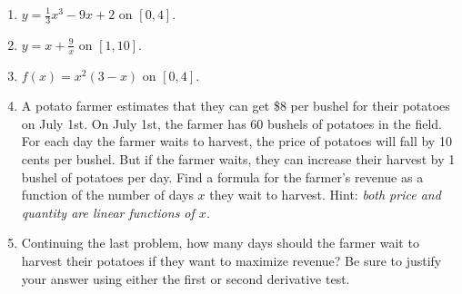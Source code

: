\documentclass[10pt]{article}
\newcommand{\ds}{\displaystyle}
\begin{document}
\begin{enumerate}
\setcounter{enumi}{\theenumCount}
\item $\ds y= \frac{1}{3}x^{3}-9x+2$ on $[0,4]$.
\vfill


\item $\ds y = x + \frac{9}{x}$ on $[1,10]$.
\vfill




\item $\ds f(x) = x^2(3-x)$ on $[0,4]$.
\vfill





\noindent
\item A potato farmer estimates that they can get \$8 per bushel for their potatoes on July 1st.  On July 1st, the farmer has 60 bushels of potatoes in the field.  For each day the farmer waits to harvest, the price of potatoes will fall by 10 cents per bushel.  But if the farmer waits, they can increase their harvest by 1 bushel of potatoes per day.  Find a formula for the farmer's revenue as a function of the number of days $x$ they wait to harvest.  Hint: \textit{both price and quantity are linear functions of $x$.  }
\vfill


\item Continuing the last problem, how many days should the farmer wait to harvest their potatoes if they want to maximize revenue?  Be sure to justify your answer using either the first or second derivative test. 
\vfill
\vfill


%
%



\setcounter{enumCount}{\theenumi}
\end{enumerate}
\end{document}
